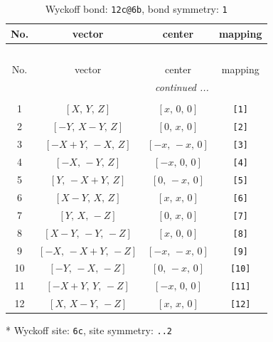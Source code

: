 \documentclass[fleqn,8pt]{jsarticle}
\begin{document}
\begin{longtable}{cccc}
\caption{Wyckoff bond: {\tt 12c@6b}, bond symmetry: {\tt 1}}
 \\
 \hline \hline
No. & vector & center & mapping \\ \hline \endfirsthead

\multicolumn{3}{l}{\tablename\ \thetable{}} \\
 \hline \hline
No. & vector & center & mapping \\ \hline \endhead

 \hline \hline
\multicolumn{3}{r}{\footnotesize\it continued ...} \\ \endfoot

 \hline \hline
\multicolumn{3}{r}{} \\ \endlastfoot

1 & $\left[ X,\, Y,\, Z \right]$ & $\left[ x,\, 0,\, 0 \right]$ & {\tt [1]} \\ \hline
2 & $\left[ - Y,\, X - Y,\, Z \right]$ & $\left[ 0,\, x,\, 0 \right]$ & {\tt [2]} \\ \hline
3 & $\left[ - X + Y,\, - X,\, Z \right]$ & $\left[ - x,\, - x,\, 0 \right]$ & {\tt [3]} \\ \hline
4 & $\left[ - X,\, - Y,\, Z \right]$ & $\left[ - x,\, 0,\, 0 \right]$ & {\tt [4]} \\ \hline
5 & $\left[ Y,\, - X + Y,\, Z \right]$ & $\left[ 0,\, - x,\, 0 \right]$ & {\tt [5]} \\ \hline
6 & $\left[ X - Y,\, X,\, Z \right]$ & $\left[ x,\, x,\, 0 \right]$ & {\tt [6]} \\ \hline
7 & $\left[ Y,\, X,\, - Z \right]$ & $\left[ 0,\, x,\, 0 \right]$ & {\tt [7]} \\ \hline
8 & $\left[ X - Y,\, - Y,\, - Z \right]$ & $\left[ x,\, 0,\, 0 \right]$ & {\tt [8]} \\ \hline
9 & $\left[ - X,\, - X + Y,\, - Z \right]$ & $\left[ - x,\, - x,\, 0 \right]$ & {\tt [9]} \\ \hline
10 & $\left[ - Y,\, - X,\, - Z \right]$ & $\left[ 0,\, - x,\, 0 \right]$ & {\tt [10]} \\ \hline
11 & $\left[ - X + Y,\, Y,\, - Z \right]$ & $\left[ - x,\, 0,\, 0 \right]$ & {\tt [11]} \\ \hline
12 & $\left[ X,\, X - Y,\, - Z \right]$ & $\left[ x,\, x,\, 0 \right]$ & {\tt [12]} \\
\end{longtable}
* Wyckoff site: {\tt 6c}, site symmetry: {\tt ..2}
\renewcommand{\arraystretch}{1.2}
\end{document}
